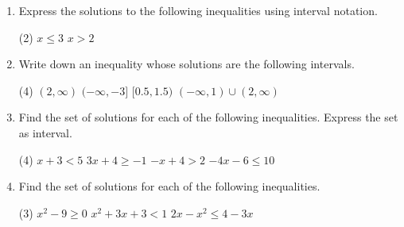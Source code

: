 \begin{enumerate}
\item Express the solutions to the following inequalities using interval notation.
\begin{tasks}[after-skip = 60pt](2)
\task $x \leq 3$
\task $x > 2$
\end{tasks}

\item Write down an inequality whose solutions are the following intervals.
\begin{tasks}[after-skip = 60pt](4)
\task $(2, \infty)$
\task $(-\infty, -3]$
\task $[0.5, 1.5)$
\task $(-\infty, 1) \cup (2, \infty)$
\end{tasks}
\fi

\item Find the set of solutions for each of the following inequalities. Express the set as interval.
\begin{tasks}[after-skip = 150pt](4)
\task $x + 3 < 5$
\task $3x + 4 \geq -1$
\task $-x + 4 > 2$
\task $-4x - 6 \leq 10$
\end{tasks}


\item Find the set of solutions for each of the following inequalities.
\begin{tasks}[after-skip = 150pt, after-item-skip = 150pt](3)
\task $x^2 - 9 \geq 0$
\task $x^2+3x+3 < 1$
\task $2x-x^2 \leq 4-3x$
\end{tasks}
\end{enumerate}